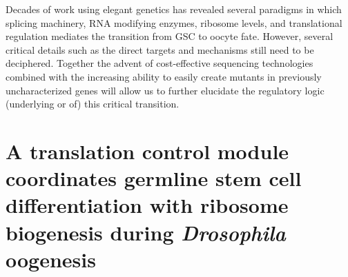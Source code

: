 \documentclass[12pt,oneside]{reedthesis}
\begin{document}
Decades of work using elegant genetics has revealed several paradigms in
which splicing machinery, RNA modifying enzymes, ribosome levels, and
translational regulation mediates the transition from GSC to oocyte
fate. However, several critical details such as the direct targets and
mechanisms still need to be deciphered. Together the advent of
cost-effective sequencing technologies combined with the increasing
ability to easily create mutants in previously uncharacterized genes
will allow us to further elucidate the regulatory logic (underlying or
of) this critical transition.



























































\hypertarget{a-translation-control-module-coordinates-germline-stem-cell-differentiation-with-ribosome-biogenesis-during-drosophila-oogenesis}{%
\chapter{\texorpdfstring{A translation control module coordinates germline stem cell differentiation with ribosome biogenesis during \emph{Drosophila} oogenesis}{A translation control module coordinates germline stem cell differentiation with ribosome biogenesis during Drosophila oogenesis}}\label{a-translation-control-module-coordinates-germline-stem-cell-differentiation-with-ribosome-biogenesis-during-drosophila-oogenesis}}
\end{document}
